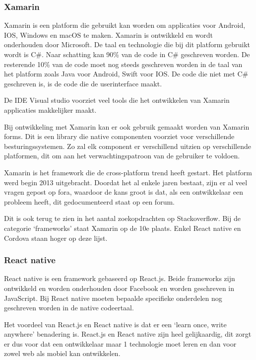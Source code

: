 		
	\subsubsection{Xamarin}
		Xamarin is een platform die gebruikt kan worden om applicaties voor Android, IOS, Windows en macOS te maken.  Xamarin is ontwikkeld en wordt onderhouden door Microsoft. De taal en technologie die bij dit platform gebruikt wordt is C\#. Naar schatting kan 90\% van de code in C\# geschreven worden. De resterende 10\% van de code moet nog steeds geschreven worden in de taal van het platform zoals Java voor Android, Swift voor IOS. De code die niet met C\# geschreven is, is de code die de userinterface maakt.
		\autocite{Altexsoft2019} \autocite{Warcholinski2020}
		
		De IDE Visual studio voorziet veel tools die het ontwikkelen van Xamarin applicaties makkelijker maakt.
		\autocite{VisualStudio2020}
		
		
		Bij ontwikkeling met Xamarin kan er ook gebruik gemaakt worden van Xamarin forms. Dit is een library die native componenten voorziet voor verschillende besturingssystemen. Zo zal elk component er verschillend uitzien op verschillende platformen, dit om aan het verwachtingspatroon van de gebruiker te voldoen.
		\autocite{Microsoft2019}
	
		Xamarin is het framework die de cross-platform trend heeft gestart. Het platform werd begin 2013 uitgebracht. Doordat het al enkele jaren bestaat, zijn er al veel vragen gepost op fora, waardoor de kans groot is dat, als een ontwikkelaar een probleem heeft, dit gedocumenteerd staat op een forum.
		
		Dit is ook terug te zien in het aantal zoekopdrachten op Stackoverflow. Bij de categorie ‘frameworks’ staat Xamarin op de 10e plaats. Enkel React native en Cordova staan hoger op deze lijst.
		\autocite{StackOverflow2020}
		
	\subsubsection{React native}
		React native\autocite{Reactnative2020} is een framework gebaseerd op React.js. Beide frameworks zijn ontwikkeld en worden onderhouden door Facebook en worden geschreven in JavaScript. Bij React native moeten bepaalde specifieke onderdelen nog geschreven worden in de native codeertaal. 
		
		Het voordeel van React.js en React native is dat er een ‘learn once, write anywhere’ benadering is. React.js en React native zijn heel gelijkaardig, dit zorgt er dus voor dat een ontwikkelaar maar 1 technologie moet leren en dan voor zowel web als mobiel kan ontwikkelen.
		
